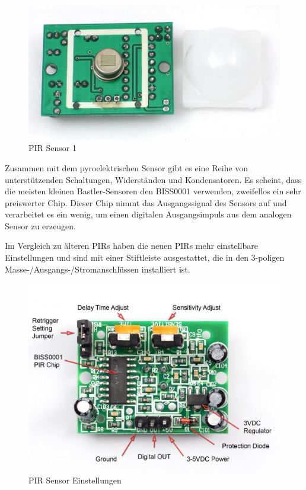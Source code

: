\documentclass[conference]{IEEEtran}
\begin{document}
\begin{figure}[h]
	\begin{center}
		\includegraphics[scale=0.15]{pi2}
	\end{center}
	\caption{PIR Sensor 1}
\end{figure}

Zusammen mit dem pyroelektrischen Sensor gibt es eine Reihe von unterstützenden Schaltungen, Widerständen und Kondensatoren. Es scheint, dass die meisten kleinen Bastler-Sensoren den BISS0001 verwenden, zweifellos ein sehr preiswerter Chip. Dieser Chip nimmt das Ausgangssignal des Sensors auf und verarbeitet es ein wenig, um einen digitalen Ausgangsimpuls aus dem analogen Sensor zu erzeugen.

Im Vergleich zu älteren PIRs haben die neuen PIRs mehr einstellbare Einstellungen und sind mit einer Stiftleiste ausgestattet, die in den 3-poligen Masse-/Ausgangs-/Stromanschlüssen installiert ist.

\begin{figure}[h]
	\begin{center}
		\includegraphics[scale=0.15]{pir3}
	\end{center}
	\caption{PIR Sensor Einstellungen}
\end{figure}
\end{document}
